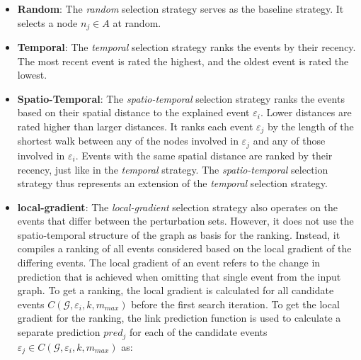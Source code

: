 \begin{itemize}
    \item \textbf{Random}: The \textit{random} selection strategy serves as the baseline strategy. It selects a node $n_j \in A$ at random.
    \item \textbf{Temporal}: The \textit{temporal} selection strategy ranks the events by their recency. The most recent event is rated the highest, and the oldest event is rated the lowest.
    \item \textbf{Spatio-Temporal}: The \textit{spatio-temporal} selection strategy ranks the events based on their spatial distance to the explained event $\varepsilon_i$. Lower distances are rated higher than larger distances. It ranks each event $\varepsilon_j$ by the length of the shortest walk between any of the nodes involved in $\varepsilon_j$ and any of those involved in $\varepsilon_i$. Events with the same spatial distance are ranked by their recency, just like in the \textit{temporal} strategy. The \textit{spatio-temporal} selection strategy thus represents an extension of the \textit{temporal} selection strategy.
    \item \textbf{local-gradient}: The \textit{local-gradient} selection strategy also operates on the events that differ between the perturbation sets. However, it does not use the spatio-temporal structure of the graph as basis for the ranking. Instead, it compiles a ranking of all events considered based on the local gradient of the differing events. The local gradient of an event refers to the change in prediction that is achieved when omitting that single event from the input graph. To get a ranking, the local gradient is calculated for all candidate events  $C(\mathcal{G}, \varepsilon_i, k, m_{max})$ before the first search iteration. To get the local gradient for the ranking, the link prediction function is used to calculate a separate prediction $pred_j$ for each of the candidate events $\varepsilon_j \in C(\mathcal{G}, \varepsilon_i, k, m_{max})$ as:

\end{itemize}
